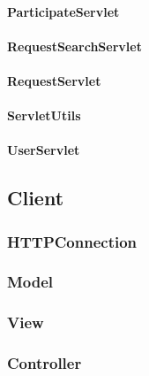 \documentclass{scrartcl}
\begin{document}
	\paragraph{ParticipateServlet}
	\paragraph{RequestSearchServlet}
	\paragraph{RequestServlet}
	\paragraph{ServletUtils}
	\paragraph{UserServlet}	
	
	\subsection{Client}
	\subsubsection{HTTPConnection}
	\subsubsection{Model}
	\subsubsection{View}
	\subsubsection{Controller}
\end{document}
